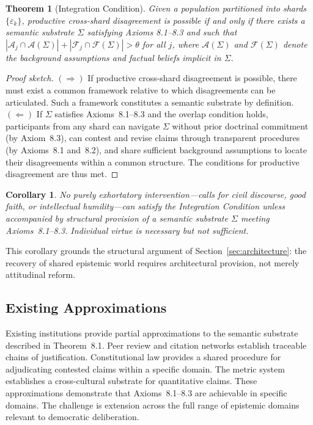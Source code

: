 \documentclass[12pt]{article}
\theoremstyle{definition}
\theoremstyle{plain}
\newtheorem{theorem}{Theorem}[section]
\newtheorem{corollary}{Corollary}[theorem]
\begin{document}
\begin{theorem}[Integration Condition]
Given a population partitioned into shards $\{\varepsilon_k\}$, productive cross-shard disagreement is possible if and only if there exists a semantic substrate $\Sigma$ satisfying Axioms 8.1--8.3 and such that $|\mathcal{A}_j \cap \mathcal{A}(\Sigma)| + |\mathcal{F}_j \cap \mathcal{F}(\Sigma)| > \theta$ for all $j$, where $\mathcal{A}(\Sigma)$ and $\mathcal{F}(\Sigma)$ denote the background assumptions and factual beliefs implicit in $\Sigma$.
\end{theorem}

\begin{proof}[Proof sketch]
$(\Rightarrow)$ If productive cross-shard disagreement is possible, there must exist a common framework relative to which disagreements can be articulated. Such a framework constitutes a semantic substrate by definition. $(\Leftarrow)$ If $\Sigma$ satisfies Axioms~8.1--8.3 and the overlap condition holds, participants from any shard can navigate $\Sigma$ without prior doctrinal commitment (by Axiom~8.3), can contest and revise claims through transparent procedures (by Axioms~8.1 and~8.2), and share sufficient background assumptions to locate their disagreements within a common structure. The conditions for productive disagreement are thus met.
\end{proof}

\begin{corollary}
No purely exhortatory intervention---calls for civil discourse, good faith, or intellectual humility---can satisfy the Integration Condition unless accompanied by structural provision of a semantic substrate $\Sigma$ meeting Axioms~8.1--8.3. Individual virtue is necessary but not sufficient.
\end{corollary}

This corollary grounds the structural argument of Section~\ref{sec:architecture}: the recovery of shared epistemic world requires architectural provision, not merely attitudinal reform.

\subsection{Existing Approximations}

Existing institutions provide partial approximations to the semantic substrate described in Theorem~8.1. Peer review and citation networks establish traceable chains of justification. Constitutional law provides a shared procedure for adjudicating contested claims within a specific domain. The metric system establishes a cross-cultural substrate for quantitative claims. These approximations demonstrate that Axioms~8.1--8.3 are achievable in specific domains. The challenge is extension across the full range of epistemic domains relevant to democratic deliberation.
\end{document}
